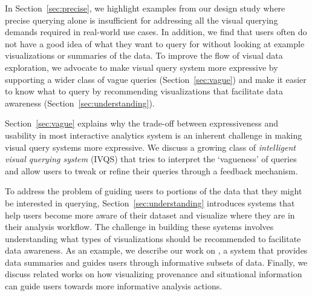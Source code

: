 \par In Section~\ref{sec:precise}, we highlight examples from our \zv design study where precise querying alone is insufficient for addressing all the visual querying demands required in real-world use cases. In addition, we find that users often do not have a good idea of what they want to query for without looking at example visualizations or summaries of the data. To improve the flow of visual data exploration, we advocate to make visual query system more expressive by supporting a wider class of vague queries (Section~\ref{sec:vague}) and make it easier to know what to query by recommending visualizations that facilitate data awareness (Section~\ref{sec:understanding}).
\par Section~\ref{sec:vague} explains why the trade-off between expressiveness and usability in most interactive analytics system is an inherent challenge in making visual query systems more expressive. We discuss a growing class of \textit{intelligent visual querying system} (IVQS) that tries to interpret the `vagueness' of queries and allow users to tweak or refine their queries through a feedback mechanism.
\par To address the problem of guiding users to portions of the data that they might be interested in querying, Section~\ref{sec:understanding} introduces systems that help users become more aware of their dataset and visualize where they are in their analysis workflow. The challenge in building these systems involves understanding what types of visualizations should be recommended to facilitate data awareness. As an example, we describe our work on \sbd, a system that provides data summaries and guides users through informative subsets of data. Finally, we discuss related works on how visualizing provenance and situational information can guide users towards more informative analysis actions.
